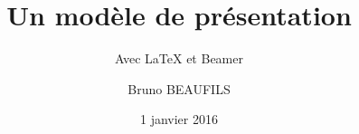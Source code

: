 \title{Un modèle de présentation}
\subtitle{Avec \LaTeX{} et Beamer}
\author{Bruno BEAUFILS}
\date{1\ier{} janvier 2016}
